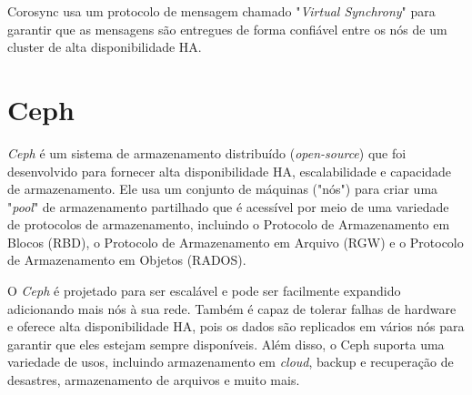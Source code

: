 Corosync usa um protocolo de mensagem chamado "\textit{Virtual Synchrony}" para garantir que as mensagens são entregues de forma confiável entre os nós de um cluster de alta disponibilidade \ac{HA}.

\section{Ceph}
\textit{Ceph} é um sistema de armazenamento distribuído (\textit{open-source}) que foi desenvolvido para fornecer alta disponibilidade \ac{HA}, escalabilidade e capacidade de armazenamento. Ele usa um conjunto de máquinas ("nós") para criar uma "\textit{pool}" de armazenamento partilhado que é acessível por meio de uma variedade de protocolos de armazenamento, incluindo o Protocolo de Armazenamento em Blocos (RBD), o Protocolo de Armazenamento em Arquivo (RGW) e o Protocolo de Armazenamento em Objetos (RADOS).

O \textit{Ceph} é projetado para ser escalável e pode ser facilmente expandido adicionando mais nós à sua rede. Também é capaz de tolerar falhas de hardware e oferece alta disponibilidade \ac{HA}, pois os dados são replicados em vários nós para garantir que eles estejam sempre disponíveis. Além disso, o Ceph suporta uma variedade de usos, incluindo armazenamento em \textit{cloud}, backup e recuperação de desastres, armazenamento de arquivos e muito mais.






